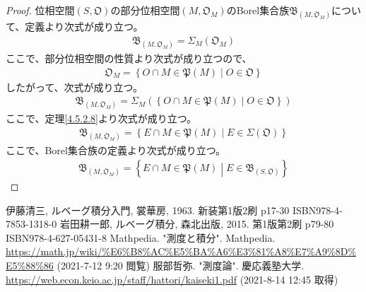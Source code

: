 \documentclass[dvipdfmx]{jsarticle}
\begin{document}
\begin{proof}
位相空間$\left( S,\mathfrak{O} \right)$の部分位相空間$\left( M,\mathfrak{O}_{M} \right)$のBorel集合族$\mathfrak{B}_{\left( M,\mathfrak{O}_{M} \right)}$について、定義より次式が成り立つ。
\begin{align*}
\mathfrak{B}_{\left( M,\mathfrak{O}_{M} \right)} = \varSigma_{M}\left( \mathfrak{O}_{M} \right)
\end{align*}
ここで、部分位相空間の性質より次式が成り立つので、
\begin{align*}
\mathfrak{O}_{M} = \left\{ O \cap M \in \mathfrak{P}(M) \middle| O \in \mathfrak{O} \right\}
\end{align*}
したがって、次式が成り立つ。
\begin{align*}
\mathfrak{B}_{\left( M,\mathfrak{O}_{M} \right)} = \varSigma_{M}\left( \left\{ O \cap M \in \mathfrak{P}(M) \middle| O \in \mathfrak{O} \right\} \right)
\end{align*}
ここで、定理\ref{4.5.2.8}より次式が成り立つ。
\begin{align*}
\mathfrak{B}_{\left( M,\mathfrak{O}_{M} \right)} = \left\{ E \cap M \in \mathfrak{P}(M) \middle| E \in \varSigma\left( \mathfrak{O} \right) \right\}
\end{align*}
ここで、Borel集合族の定義より次式が成り立つ。
\begin{align*}
\mathfrak{B}_{\left( M,\mathfrak{O}_{M} \right)} = \left\{ E \cap M \in \mathfrak{P}(M) \middle| E \in \mathfrak{B}_{\left( S,\mathfrak{O} \right)} \right\}
\end{align*}
\end{proof}
\begin{thebibliography}{50}
  伊藤清三, ルベーグ積分入門, 裳華房, 1963. 新装第1版2刷 p17-30 ISBN978-4-7853-1318-0
  岩田耕一郎, ルベーグ積分, 森北出版, 2015. 第1版第2刷 p79-80 ISBN978-4-627-05431-8
  Mathpedia. "測度と積分". Mathpedia. \url{https://math.jp/wiki/%E6%B8%AC%E5%BA%A6%E3%81%A8%E7%A9%8D%E5%88%86} (2021-7-12 9:20 閲覧)
  服部哲弥. "測度論". 慶応義塾大学. \url{https://web.econ.keio.ac.jp/staff/hattori/kaiseki1.pdf} (2021-8-14 12:45 取得)
\end{thebibliography}
\end{document}
